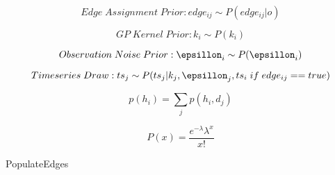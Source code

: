 \documentclass{scrartcl}
\begin{document}
\begin{equation}
  Edge \; Assignment \; Prior: edge_{ij} \sim P(edge_{ij} | o)
\end{equation}

\begin{equation}
  GP \; Kernel \; Prior: k_i \sim P(k_i)
\end{equation}

\begin{equation}
  Observation \; Noise \; Prior: \epsillon_i \sim P(\epsillon_i)
\end{equation}

\begin{equation}
  Timeseries \; Draw: ts_j \sim P(ts_j | k_j, \epsillon_j, ts_i \; if \; edge_{ij} == true)
\end{equation}

\begin{equation}
    p(h_{i}) = \sum_{j} p(h_{i},d_{j})
\end{equation}

\begin{equation}
P\left( x \right) = \frac{{e^{ - \lambda } \lambda ^x }}{{x!}}
\end{equation}


\begin{algorithm}
  \DontPrintSemicolon
  \BlankLine
   \Blankline  
\caption{PopulateEdges}
\end{algorithm} 
\end{document}
